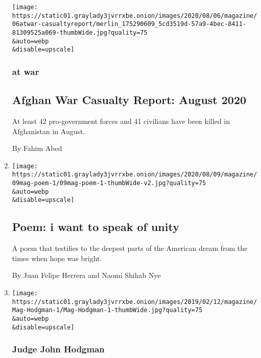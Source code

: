\begin{enumerate}
  \texttt{[image: https://static01.graylady3jvrrxbe.onion/images/2020/08/06/magazine/06atwar-casualtyreport/merlin\_175290609\_5cd3519d-57a9-4bec-8411-81309525a069-thumbWide.jpg?quality=75\\\&auto=webp\\\&disable=upscale]}

  \hypertarget{at-war-1}{%
  \subsubsection{at war}\label{at-war-1}}

  \hypertarget{afghan-war-casualty-report-august-2020}{%
  \subsection{Afghan War Casualty Report: August
  2020}\label{afghan-war-casualty-report-august-2020}}

  At least 42 pro-government forces and 41 civilians have been killed in
  Afghanistan in August.

  By Fahim Abed
\item
  \href{/2020/08/06/magazine/poem-i-want-to-speak-of-unity.html}{}

  \texttt{[image: https://static01.graylady3jvrrxbe.onion/images/2020/08/09/magazine/09mag-poem-1/09mag-poem-1-thumbWide-v2.jpg?quality=75\\\&auto=webp\\\&disable=upscale]}

  \hypertarget{poem-i-want-to-speak-of-unity}{%
  \subsection{Poem: i want to speak of
  unity}\label{poem-i-want-to-speak-of-unity}}

  A poem that testifies to the deepest parts of the American dream from
  the times when hope was bright.

  By Juan Felipe Herrera and Naomi Shihab Nye
\item
  \href{/2020/08/06/magazine/judge-john-hodgman-on-walking-and-talking.html}{}

  \texttt{[image: https://static01.graylady3jvrrxbe.onion/images/2019/02/12/magazine/Mag-Hodgman-1/Mag-Hodgman-1-thumbWide.jpg?quality=75\\\&auto=webp\\\&disable=upscale]}

  \hypertarget{judge-john-hodgman}{%
  \subsubsection{Judge John Hodgman}\label{judge-john-hodgman}}


\end{enumerate}
